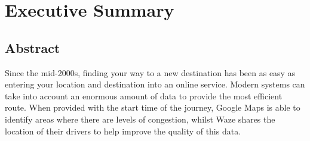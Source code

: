 \documentclass[ %
                    author={Alexander Hill},
                supervisor={Dr. Benjamin Sach},
                    degree={MEng},
                     title={MARMOSET},
                  subtitle={Multi-Agent Route Management using Online Simulation for Efficient Transportation},
                      type={research},
                      year={2016} ]{dissertation}
\begin{document}


\maketitle


\frontmatter


\makedecl


\tableofcontents
\listoffigures
\lstlistoflistings



\chapter*{Executive Summary}

\section*{Abstract}

Since the mid-2000s, finding your way to a new destination has been as easy as
entering your location and destination into an online service. Modern systems
can take into account an enormous amount of data to provide the most efficient
route. When provided with the start time of the journey, Google Maps is able to
identify areas where there are levels of congestion, whilst Waze shares the
location of their drivers to help improve the quality of this data.
\end{document}
